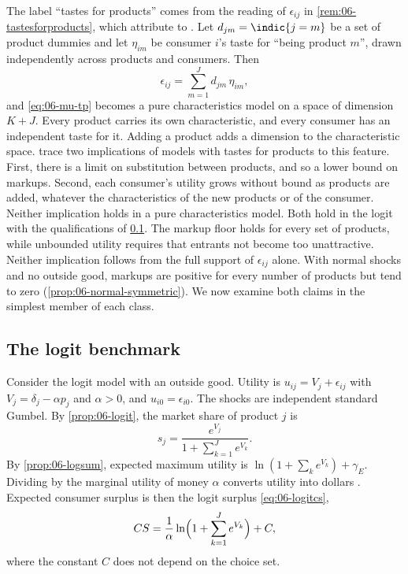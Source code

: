 The label ``tastes for products'' comes from the reading of $\epsilon_{ij}$ in \cref{rem:06-tastesforproducts}, which
\citet{BerryPakes2007} attribute to \citet{CaplinNalebuff1991}. Let $d_{jm} = \indic\{j = m\}$ be a set of product
dummies and let $\eta_{im}$ be consumer $i$'s taste for ``being product $m$'', drawn independently across products and
consumers. Then
\begin{equation}\label{eq:06-dummies}
  \epsilon_{ij} = \sum_{m=1}^{J} d_{jm}\, \eta_{im},
\end{equation}
and \eqref{eq:06-mu-tp} becomes a pure characteristics model on a space of dimension $K + J$. Every product carries
its own characteristic, and every consumer has an independent taste for it. Adding a product adds a dimension to the
characteristic space. \citet[p.~6]{BerryPakes2007} trace two implications of models with tastes for products to this
feature. First, there is a limit on substitution between products, and so a lower bound on markups. Second, each
consumer's utility grows without bound as products are added, whatever the characteristics of the new products or of
the consumer. Neither implication holds in a pure characteristics model. Both hold in the logit with the
qualifications of \cref{sec:06-logit-bench}. The markup floor holds for every set of products, while unbounded
utility requires that entrants not become too unattractive. Neither implication follows from the full support of
$\epsilon_{ij}$ alone. With normal shocks and no outside good, markups are positive for every number of products but tend
to zero (\cref{prop:06-normal-symmetric}). We now examine both claims in the simplest member of each class.

\subsection{The logit benchmark}\label{sec:06-logit-bench}

Consider the logit model with an outside good. Utility is $u_{ij} = V_j + \epsilon_{ij}$ with $V_j = \delta_j - \alpha
p_j$ and $\alpha > 0$, and $u_{i0} = \epsilon_{i0}$. The shocks are independent standard Gumbel. By
\cref{prop:06-logit}, the market share of product $j$ is
\begin{equation}\label{eq:06-logit-share-p4}
  s_j = \frac{e^{V_j}}{1 + \sum_{k=1}^{J} e^{V_k}}.
\end{equation}
By \cref{prop:06-logsum}, expected maximum utility is $\ln(1 + \sum_k e^{V_k}) + \gamma_E$. Dividing by the marginal
utility of money $\alpha$ converts utility into dollars \citep{SmallRosen1981}. Expected consumer surplus is then the
logit surplus \eqref{eq:06-logitcs},
\begin{equation}\label{eq:06-logit-cs-p4}
  CS = \frac{1}{\alpha} \ln\Bigl(1 + \sum_{k=1}^{J} e^{V_k}\Bigr) + C,
\end{equation}
where the constant $C$ does not depend on the choice set.

